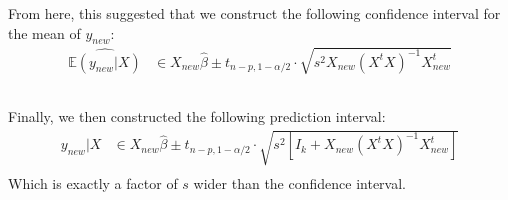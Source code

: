 \begin{frame}[fragile] \frametitle{}

From here, this suggested that we construct the following
confidence interval for the mean of $y_{new}$:
\begin{align*}
\widehat{\mathbb{E}(y_{new} | X)} &\in X_{new} \widehat{\beta} \pm t_{n-p,1-\alpha/2} \cdot
\sqrt{s^2 X_{new} (X^t X)^{-1} X_{new}^t} \\
\end{align*}

\end{frame}

\begin{frame}[fragile] \frametitle{}

Finally, we then constructed the following prediction interval:
\begin{align*}
y_{new} | X &\in X_{new} \widehat{\beta} \pm t_{n-p,1-\alpha/2} \cdot
\sqrt{s^2 \left[ I_k + X_{new} (X^t X)^{-1} X_{new}^t \right]} \\
\end{align*}
Which is exactly a factor of $s$ wider than the confidence interval.

\end{frame}














